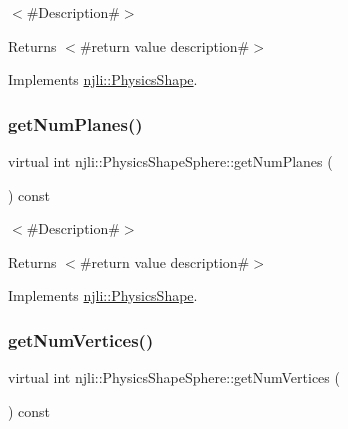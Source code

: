 $<$\#\+Description\#$>$

\begin{DoxyReturn}{Returns}
$<$\#return value description\#$>$ 
\end{DoxyReturn}


Implements \mbox{\hyperlink{classnjli_1_1_physics_shape_a24df999ba2b7ac0d9abda09c4f17c2fe}{njli\+::\+Physics\+Shape}}.

\mbox{\label{classnjli_1_1_physics_shape_sphere_ad8e9f27811164163a87692725502de6d}} 
\subsubsection{\texorpdfstring{get\+Num\+Planes()}{getNumPlanes()}}
{\footnotesize\ttfamily virtual int njli\+::\+Physics\+Shape\+Sphere\+::get\+Num\+Planes (\begin{DoxyParamCaption}{ }\end{DoxyParamCaption}) const\hspace{0.3cm}{\ttfamily [virtual]}}

$<$\#\+Description\#$>$

\begin{DoxyReturn}{Returns}
$<$\#return value description\#$>$ 
\end{DoxyReturn}


Implements \mbox{\hyperlink{classnjli_1_1_physics_shape_a11cb80220393bfce177b8bdc34f7f359}{njli\+::\+Physics\+Shape}}.

\mbox{\label{classnjli_1_1_physics_shape_sphere_a9f7815a4e99feb1c2c0e62f6b7f0adbf}} 
\subsubsection{\texorpdfstring{get\+Num\+Vertices()}{getNumVertices()}}
{\footnotesize\ttfamily virtual int njli\+::\+Physics\+Shape\+Sphere\+::get\+Num\+Vertices (\begin{DoxyParamCaption}{ }\end{DoxyParamCaption}) const\hspace{0.3cm}{\ttfamily [virtual]}}

